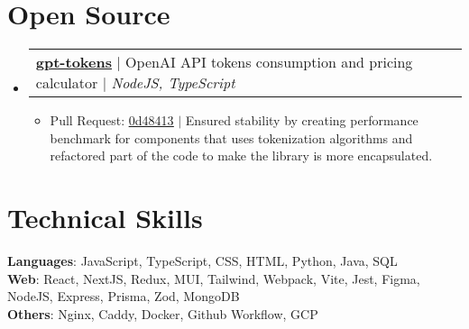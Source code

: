 \documentclass[letterpaper,11pt]{article}
\makeatletter
\newcommand{\resumeItem}[1]{
  \item\small{
    {#1 \vspace{-2pt}}
  }
}
\newcommand{\resumeProjectHeading}[2]{
    \item
    \begin{tabular*}{0.97\textwidth}{l@{\extracolsep{\fill}}r}
      \small#1 & #2 \\
    \end{tabular*}\vspace{-7pt}
}
\newcommand{\resumeSubHeadingListStart}{\begin{itemize}[leftmargin=0.15in, label={}]}
\newcommand{\resumeSubHeadingListEnd}{\end{itemize}}
\newcommand{\resumeItemListStart}{\begin{itemize}}
\newcommand{\resumeItemListEnd}{\end{itemize}\vspace{-5pt}}
\makeatother
\begin{document}
\section{Open Source}
  \resumeSubHeadingListStart
    \resumeProjectHeading
      {\textbf{\underline{\href{https://www.npmjs.com/package/gpt-tokens}{gpt-tokens}}} $|$ OpenAI API tokens consumption and pricing calculator $|$ \emph  {NodeJS, TypeScript}}{}
      \resumeItemListStart
        \resumeItem{\faGithub \thinspace \thinspace Pull Request: \underline{\href{https://github.com/Cainier/gpt-tokens/pull/50}{0d48413}} $|$ Ensured stability by creating performance benchmark for components that uses tokenization algorithms and refactored part of the code to make the library is more encapsulated.}
      \resumeItemListEnd
  \resumeSubHeadingListEnd

\section{Technical Skills}
 \begin{itemize}[leftmargin=0.15in, label={}]
    \small{\item{
      \textbf{Languages}{: JavaScript, TypeScript, CSS, HTML, Python, Java, SQL} \\
      \textbf{Web}{: React, NextJS, Redux, MUI, Tailwind, Webpack, Vite, Jest, Figma, NodeJS, Express, Prisma, Zod, MongoDB} \\
      \textbf{Others}{: Nginx, Caddy, Docker, Github Workflow, GCP } \\
     }}
 \end{itemize}


\end{document}
